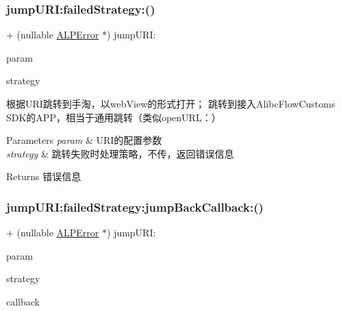 \subsubsection{\texorpdfstring{jump\+U\+R\+I\+:failed\+Strategy\+:()}{jumpURI:failedStrategy:()}}
{\footnotesize\ttfamily + (nullable \mbox{\hyperlink{interface_a_l_p_error}{A\+L\+P\+Error}} $\ast$) jump\+U\+R\+I\+: \begin{DoxyParamCaption}\item[{(nonnull \mbox{\hyperlink{interface_a_l_p_t_b_u_r_i_param}{A\+L\+P\+T\+B\+U\+R\+I\+Param}} $\ast$)}]{param }\item[{failedStrategy:(nullable \mbox{\hyperlink{interface_a_l_p_jump_failed_strategy}{A\+L\+P\+Jump\+Failed\+Strategy}} $\ast$)}]{strategy }\end{DoxyParamCaption}}

根据\+U\+R\+I跳转到手淘，以web\+View的形式打开； 跳转到接入\+Alibc\+Flow\+Customs S\+D\+K的\+A\+P\+P，相当于通用跳转（类似open\+U\+R\+L：）


\begin{DoxyParams}{Parameters}
{\em param} & U\+R\+I的配置参数 \\
\hline
{\em strategy} & 跳转失败时处理策略，不传，返回错误信息\\
\hline
\end{DoxyParams}
\begin{DoxyReturn}{Returns}
错误信息 
\end{DoxyReturn}
\mbox{\label{interface_a_l_p_t_b_link_partner_s_d_k_a64ed79c245f34bf158de3ca83630a138}} 
\subsubsection{\texorpdfstring{jump\+U\+R\+I\+:failed\+Strategy\+:jump\+Back\+Callback\+:()}{jumpURI:failedStrategy:jumpBackCallback:()}}
{\footnotesize\ttfamily + (nullable \mbox{\hyperlink{interface_a_l_p_error}{A\+L\+P\+Error}} $\ast$) jump\+U\+R\+I\+: \begin{DoxyParamCaption}\item[{(nonnull \mbox{\hyperlink{interface_a_l_p_t_b_u_r_i_param}{A\+L\+P\+T\+B\+U\+R\+I\+Param}} $\ast$)}]{param }\item[{failedStrategy:(nullable \mbox{\hyperlink{interface_a_l_p_jump_failed_strategy}{A\+L\+P\+Jump\+Failed\+Strategy}} $\ast$)}]{strategy }\item[{jumpBackCallback:(nullable A\+L\+P\+Jump\+Back\+Block)}]{callback }\end{DoxyParamCaption}}


